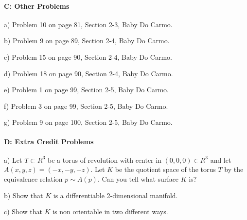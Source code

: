\documentclass[12pt]{article}
\begin{document}
\paragraph{C: Other Problems}
\begin{itemize}
	{\item a) Problem 10 on page 81, Section 2-3, Baby Do Carmo.}
	{\item b) Problem 9 on page 89, Section 2-4, Baby Do Carmo.}
	{\item c) Problem 15 on page 90, Section 2-4, Baby Do Carmo.}
	{\item d) Problem 18 on page 90, Section 2-4, Baby Do Carmo.}
	{\item e) Problem 1 on page 99, Section 2-5, Baby Do Carmo.}
	{\item f) Problem 3 on page 99, Section 2-5, Baby Do Carmo.}
	{\item g) Problem 9 on page 100, Section 2-5, Baby Do Carmo.}
\end{itemize}


\paragraph{D: Extra Credit Problems}
\begin{itemize}
	{\item a) Let $T\subset R^3$ be a torus of revolution with center in
		$(0,0,0)\in R^3$ and let $A(x,y,z)=(-x,-y,-z)$.
		Let $K$ be the quotient space of the torus $T$ by the equivalence
		relation $p\sim A(p)$.  Can you tell what surface $K$ is? }
	{\item b) Show that $K$ is a differentiable 2-dimensional manifold.}
	{\item c) Show that $K$ is non orientable in two different ways.}
\end{itemize}
\end{document}
